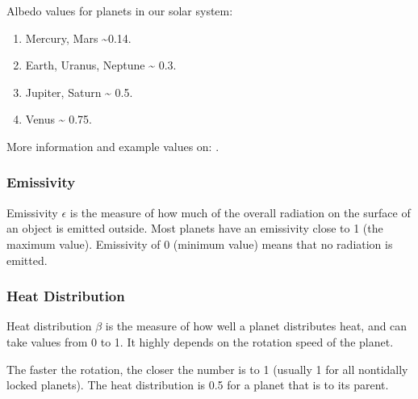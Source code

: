 \documentclass[letterpaper,10pt,english]{sphinxmanual}
\begin{document}
\sphinxAtStartPar
Albedo values for planets in our solar system:
\begin{enumerate}
%
\item {} 
\sphinxAtStartPar
Mercury, Mars \textasciitilde{}0.14.

\item {} 
\sphinxAtStartPar
Earth, Uranus, Neptune \textasciitilde{} 0.3.

\item {} 
\sphinxAtStartPar
Jupiter, Saturn \textasciitilde{} 0.5.

\item {} 
\sphinxAtStartPar
Venus \textasciitilde{} 0.75.

\end{enumerate}

\sphinxAtStartPar
More information and example values on: .


\subsubsection{Emissivity}
\label{\detokenize{quantities/surface/emission/emissivity:emissivity}}\label{\detokenize{quantities/surface/emission/emissivity::doc}}\label{\detokenize{quantities/surface/emission/emissivity:id1}}
\sphinxAtStartPar
Emissivity \(\epsilon\) is the measure of how much of the overall radiation on the surface of an object
is emitted outside. Most planets have an emissivity close to 1 (the maximum value).
Emissivity of 0 (minimum value) means that no radiation is emitted.


\subsubsection{Heat Distribution}
\label{\detokenize{quantities/surface/emission/heat_distribution:heat-distribution}}\label{\detokenize{quantities/surface/emission/heat_distribution::doc}}\label{\detokenize{quantities/surface/emission/heat_distribution:id1}}
\sphinxAtStartPar
Heat distribution \(\beta\) is the measure of how well a planet distributes heat,
and can take values from 0 to 1. It highly depends on the rotation speed of the planet.

\sphinxAtStartPar
The faster the rotation, the closer the number is to 1 (usually 1 for all non\sphinxhyphen{}tidally locked planets).
The heat distribution is 0.5 for a planet that is {\hyperref[\detokenize{quantities/children_orbit_limits/tidal_locking_radius:id1}]{}} to its parent.
\end{document}
